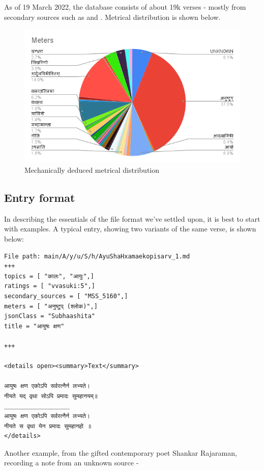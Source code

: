 \documentclass[11pt]{article}
\begin{document}
As of 19 March 2022, the database consists of about 19k verses - mostly from secondary sources such as \cite{subhashita-1952} and \cite{mss-1974}. Metrical distribution is shown below.

\begin{figure}[h]
\caption{Mechanically deduced metrical distribution}
\centering
\includegraphics[width=1.0\textwidth]{Meters}
\end{figure}

\subsection{Entry format}
In describing the essentials of the file format we've settled upon, it is best to start with examples. A typical entry, showing two variants of the same verse, is shown below:

\begin{verbatim}
File path: main/A/y/u/S/h/AyuShaHxamaekopisarv_1.md
+++
topics = [ "कालः", "आयुः",]
ratings = [ "vvasuki:5",]
secondary_sources = [ "MSS_5160",]
meters = [ "अनुष्टुप् (श्लोक)",]
jsonClass = "Subhaashita"
title = "आयुषः क्षण"

+++

<details open><summary>Text</summary>

आयुषः क्षण एकोऽपि सर्वरत्नैर्न लभ्यते।  
नीयते यद् वृथा सोऽपि प्रमादः सुमहानयम्॥
__________________
आयुषः क्षण एकोऽपि सर्वरत्नैर्न लभ्यते।  
नीयते स वृथा येन प्रमादः सुमहानहो ॥
</details>

\end{verbatim}

Another example, from the gifted contemporary poet Shankar Rajaraman, recording a note from an unknown source - 
\end{document}
